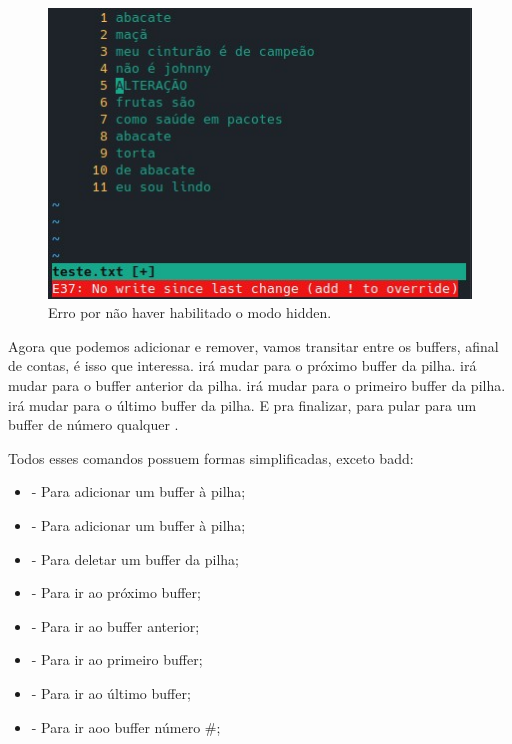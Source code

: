 \begin{figure}[!htb]
\centering
\includegraphics[scale=0.80]{recursos_avancados/bn_error.jpg}
\caption{Erro por não haver habilitado o modo hidden.}
\end{figure}

Agora que podemos adicionar e remover, vamos transitar entre os buffers, afinal de contas, é isso que interessa.
 irá mudar para o próximo buffer da pilha.
 irá mudar para o buffer anterior da pilha.
 irá mudar para o primeiro buffer da pilha.
 irá mudar para o último buffer da pilha.
E pra finalizar, para pular para um buffer de número qualquer .

Todos esses comandos possuem formas simplificadas, exceto badd:
\begin{itemize}
    \item {} - Para adicionar um buffer à pilha;
    \item {} - Para adicionar um buffer à pilha;
    \item {} - Para deletar um buffer da pilha;
    \item {} - Para ir ao próximo buffer;
    \item {} - Para ir ao buffer anterior;
    \item {} - Para ir ao primeiro buffer;
    \item {} - Para ir ao último buffer;
    \item {} - Para ir aoo buffer número \#;
\end{itemize}

